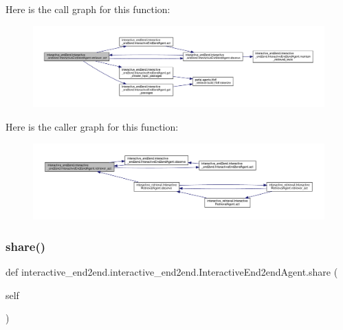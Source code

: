 Here is the call graph for this function\+:
\nopagebreak
\begin{figure}[H]
\begin{center}
\leavevmode
\includegraphics[width=350pt]{classinteractive__end2end_1_1interactive__end2end_1_1InteractiveEnd2endAgent_a60ab442ea924f06664b432e9c3e9f7aa_cgraph}
\end{center}
\end{figure}
Here is the caller graph for this function\+:
\nopagebreak
\begin{figure}[H]
\begin{center}
\leavevmode
\includegraphics[width=350pt]{classinteractive__end2end_1_1interactive__end2end_1_1InteractiveEnd2endAgent_a60ab442ea924f06664b432e9c3e9f7aa_icgraph}
\end{center}
\end{figure}
\mbox{\label{classinteractive__end2end_1_1interactive__end2end_1_1InteractiveEnd2endAgent_a01ec12a5c02e3e38f0183945099bbbce}} 
\subsubsection{\texorpdfstring{share()}{share()}}
{\footnotesize\ttfamily def interactive\+\_\+end2end.\+interactive\+\_\+end2end.\+Interactive\+End2end\+Agent.\+share (\begin{DoxyParamCaption}\item[{}]{self }\end{DoxyParamCaption})}

